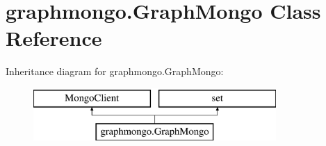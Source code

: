 \hypertarget{classgraphmongo_1_1GraphMongo}{}\section{graphmongo.\+Graph\+Mongo Class Reference}
\label{classgraphmongo_1_1GraphMongo}
Inheritance diagram for graphmongo.\+Graph\+Mongo\+:\begin{figure}[H]
\begin{center}
\leavevmode
\includegraphics[height=2.000000cm]{classgraphmongo_1_1GraphMongo}
\end{center}
\end{figure}
